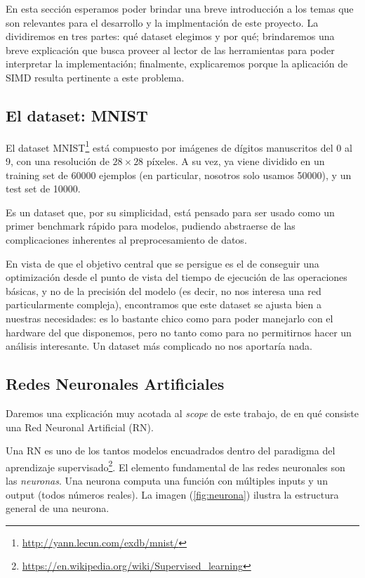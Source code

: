 En esta sección esperamos poder brindar una breve introducción a los temas que son relevantes para el desarrollo y la implmentación de este proyecto. La dividiremos en tres partes: qué dataset elegimos y por qué; brindaremos una breve explicación que busca proveer al lector de las herramientas para poder interpretar la implementación; finalmente, explicaremos porque la aplicación de SIMD resulta pertinente a este problema.

\subsection{El dataset: MNIST}

El dataset MNIST\footnote{\url{http://yann.lecun.com/exdb/mnist/}} está compuesto por imágenes de dígitos manuscritos del 0 al 9, con una resolución de $28\times 28$ píxeles. A su vez, ya viene dividido en un training set de 60000 ejemplos (en particular, nosotros solo usamos 50000), y un test set de 10000.

Es un dataset que, por su simplicidad, está pensado para ser usado como un primer benchmark rápido para modelos, pudiendo abstraerse de las complicaciones inherentes al preprocesamiento de datos. 

En vista de que el objetivo central que se persigue es el de conseguir una optimización desde el punto de vista del tiempo de ejecución de las operaciones básicas, y no de la precisión del modelo (es decir, no nos interesa una red particularmente compleja), encontramos que este dataset se ajusta bien a nuestras necesidades: es lo bastante chico como para poder manejarlo con el hardware del que disponemos, pero no tanto como para no permitirnos hacer un análisis interesante. Un dataset más complicado no nos aportaría nada.

\subsection{Redes Neuronales Artificiales}

Daremos una explicación muy acotada al \emph{scope} de este trabajo, de en qué consiste una Red Neuronal Artificial (RN).

Una RN es uno de los tantos modelos encuadrados dentro del paradigma del aprendizaje supervisado\footnote{\url{https://en.wikipedia.org/wiki/Supervised_learning}}. El elemento fundamental de las redes neuronales son las \emph{neuronas}. Una neurona computa una función con múltiples inputs y un output (todos números reales). La imagen (\ref{fig:neurona}) ilustra la estructura general de una neurona.

